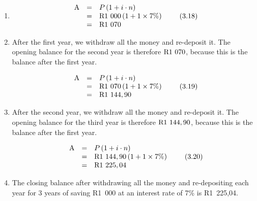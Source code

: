 {\begin{mdframed}[linewidth=4, leftmargin=40, rightmargin=40]
\begin{exercise}
\begin{enumerate}[noitemsep, label=\textbf{Step} \textbf{\arabic*}. ]
      \item  
      \label{m39334*id72165}\nopagebreak\noindent{}
    \begin{equation}
    \begin{array}{ccc}\hfill \mathrm{A}& =& P\left(1+i\ensuremath{\cdot}n\right)\hfill \\ & =& \mathrm{R}1\phantom{\rule{3.33333pt}{0ex}}000\left(1+1\ensuremath{\times}7\%\right)\hfill \\ & =& \mathrm{R}1\phantom{\rule{3.33333pt}{0ex}}070\hfill \end{array}\tag{3.18}
      \end{equation}
      \item  
      \label{m39334*id72277}After the first year, we withdraw all the money and re-deposit it. The opening balance for the second year is therefore $\mathrm{R}1\phantom{\rule{3.33333pt}{0ex}}070$, because this is the balance after the first year.\par 
      \label{m39334*id72302}\nopagebreak\noindent{}
    \begin{equation}
    \begin{array}{ccc}\hfill \mathrm{A}& =& P\left(1+i\ensuremath{\cdot}n\right)\hfill \\ & =& \mathrm{R}1\phantom{\rule{3.33333pt}{0ex}}070\left(1+1\ensuremath{\times}7\%\right)\hfill \\ & =& \mathrm{R}1\phantom{\rule{3.33333pt}{0ex}}144,90\hfill \end{array}\tag{3.19}
      \end{equation}
      \item  
      \label{m39334*id72418}After the second year, we withdraw all the money and re-deposit it. The opening balance for the third year is therefore $\mathrm{R}1\phantom{\rule{3.33333pt}{0ex}}144,90$, because this is the balance after the first year.\par 
      \label{m39334*id72447}\nopagebreak\noindent{}
    \begin{equation}
    \begin{array}{ccc}\hfill \mathrm{A}& =& P\left(1+i\ensuremath{\cdot}n\right)\hfill \\ & =& \mathrm{R}1\phantom{\rule{3.33333pt}{0ex}}144,90\left(1+1\ensuremath{\times}7\%\right)\hfill \\ & =& \mathrm{R}1\phantom{\rule{3.33333pt}{0ex}}225,04\hfill \end{array}\tag{3.20}
      \end{equation}
      \item  
      \label{m39334*id72567}The closing balance after withdrawing all the money and re-depositing each year for 3 years of saving R1~000 at an interest rate of 7\% is R1~225,04. \par 
      \end{enumerate}
    \end{exercise}
    \end{mdframed}
    }
